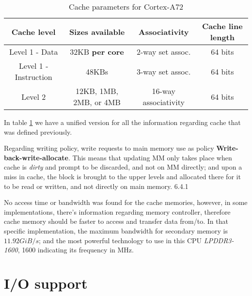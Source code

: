 \begin{table}[H]
\begin{tabular}{|c|c|c|c|}
	
	\hline 
	Cache level & Sizes available & Associativity & Cache line length \\ 
	\hline 
	Level 1 - Data & 32KB \textbf{per core} & 2-way set assoc. & 64 bits \\ 
	\hline 
	Level 1 - Instruction & 48KBs & 3-way set assoc. &  64 bits \\ 
	\hline 
	Level 2 & 12KB, 1MB, 2MB, or 4MB & 16-way associativity & 64 bits \\ 
	\hline	
\end{tabular} 
\caption{Cache parameters for Cortex-A72}
\label{cachetable}
\end{table}

In table \ref{cachetable} we have a unified version for all the information regarding cache that was defined previously.

Regarding writing policy, write requests to main memory use as policy \textbf{ Write-back-write-allocate}. This means that updating MM only takes place when cache is \textit{dirty} and prompt to be discarded, and not on MM directly; and upon a miss in cache, the block is brought to the upper levels and allocated there for it to be read or written, and not directly on main memory.
\cite{cortexA72manual} 6.4.1

No access time or bandwidth was found for the cache memories, however, in some implementations, there's information regarding memory controller, therefore cache memory should be faster to access and transfer data from/to. In that specific implementation, the maximum bandwidth for secondary memory is $11.92 GiB/s$; and the most powerful technology to use in this CPU \textit{LPDDR3-1600}, 1600 indicating its frequency in MHz.\cite{mt6797}

\section{I/O support}